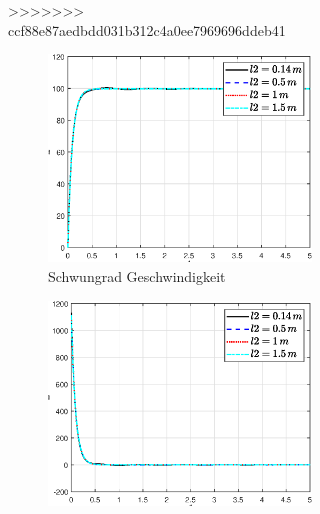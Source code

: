 \begin{figure}
\begin{figure}
>>>>>>> ccf88e87aedbdd031b312c4a0ee7969696ddeb41
    \captionsetup[subfigure]{justification=centering,font=footnotesize}
    \begin{subfigure}[b]{0.49\linewidth}
        \includegraphics[width=\linewidth]{Bilder/5_sensi/fig/l2/phi_punkt.eps}
        \caption{Schwungrad Geschwindigkeit}
        \label{fig:l2_phi_punkt}
    \end{subfigure}
    \begin{subfigure}[b]{0.49 \linewidth}
        \includegraphics[width=\linewidth]{Bilder/5_sensi/fig/l2/phi_punkt_punkt.eps}

\end{subfigure}
\end{figure}
\end{figure}

